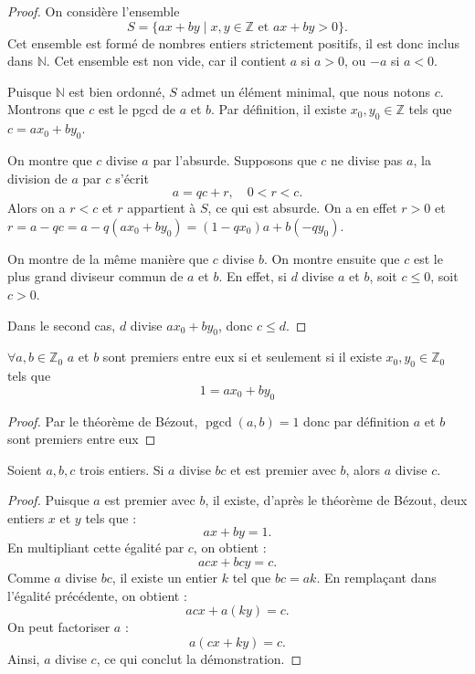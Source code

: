 \begin{proof}
On considère l’ensemble 
\[
S = \{ax + by \mid x, y \in \mathbb{Z} \text{ et } ax + by > 0\}.
\]
Cet ensemble est formé de nombres entiers strictement positifs, il est donc inclus dans \( \mathbb{N} \).  
Cet ensemble est non vide, car il contient \( a \) si \( a > 0 \), ou \( -a \) si \( a < 0 \).  

Puisque \( \mathbb{N} \) est bien ordonné, \( S \) admet un élément minimal, que nous notons \( c \). Montrons que \( c \) est le pgcd de \( a \) et \( b \).  
Par définition, il existe \( x_0, y_0 \in \mathbb{Z} \) tels que \( c = ax_0 + by_0 \).  

On montre que \( c \) divise \( a \) par l’absurde. Supposons que \( c \) ne divise pas \( a \),  
la division de \( a \) par \( c \) s’écrit
\[
a = q c + r, \quad 0 < r < c.
\]
Alors on a \( r < c \) et \( r \) appartient à \( S \), ce qui est absurde.  
On a en effet \( r > 0 \) et \( r = a - qc = a - q(ax_0 + by_0) = (1-qx_0)a + b(-qy_0) \).  

On montre de la même manière que \( c \) divise \( b \).  
On montre ensuite que \( c \) est le plus grand diviseur commun de \( a \) et \( b \).  
En effet, si \( d \) divise \( a \) et \( b \), soit \( c \leq 0 \), soit \( c > 0 \).  

Dans le second cas, \( d \) divise \( ax_0 + by_0 \), donc \( c \leq d \).
\end{proof}

\begin{corollaire}
    $\forall a,b \in \mathbb{Z}_0$ $a$ et $b$ sont premiers entre eux si et seulement si il existe $x_0,y_0\in \mathbb{Z}_0$ tels que 
    \[
    1=ax_0+by_0
    \]
\end{corollaire}

\begin{proof}
    Par le théorème de Bézout, $\operatorname{pgcd}(a,b)=1$ donc par définition $a$ et $b$ sont premiers entre eux
\end{proof}

\begin{lemme}[Gauss]
Soient \( a, b, c \) trois entiers. Si \( a \) divise \( bc \) et est premier avec \( b \), alors \( a \) divise \( c \).
\end{lemme}

\begin{proof}
    Puisque \( a \) est premier avec \( b \), il existe, d'après le théorème de Bézout, deux entiers \( x \) et \( y \) tels que :
\[
ax + by = 1.
\]
En multipliant cette égalité par \( c \), on obtient :
\[
acx + bcy = c.
\]
Comme \( a \) divise \( bc \), il existe un entier \( k \) tel que \( bc = ak \). En remplaçant dans l’égalité précédente, on obtient :
\[
acx + a(ky) = c.
\]
On peut factoriser \( a \) :
\[
a(cx + ky) = c.
\]
Ainsi, \( a \) divise \( c \), ce qui conclut la démonstration.
\end{proof}
